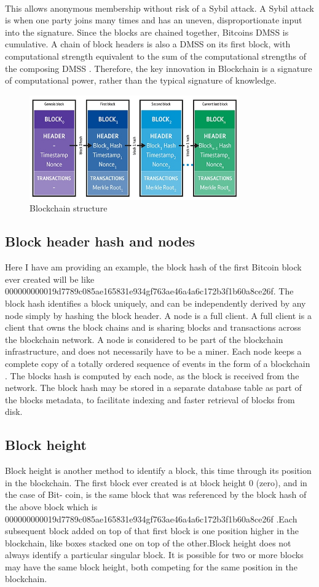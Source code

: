 \paragraph{}This allows anonymous membership without risk of a Sybil attack. A Sybil attack is when one
party joins many times and has an uneven, disproportionate input into the signature. Since the
blocks are chained together, Bitcoins DMSS is cumulative. A chain of block headers is also a
DMSS on its first block, with computational strength equivalent to the sum of the computational
strengths of the composing DMSS . Therefore, the key innovation in Blockchain is a signature of
computational power, rather than the typical signature of knowledge.
\begin{figure}[h]
	\centering
	\includegraphics[width=9cm]{./blockchain-diagrams-02}
	\caption{Blockchain structure}
\end{figure}
\subsection{Block header hash and nodes}
Here I have am providing an example, the block hash of the first Bitcoin block ever created will
be like 000000000019d7789c085ae165831e934gf763ae46a4a6c172b3f1b60a8ce26f. The block hash
identifies a block uniquely, and can be independently derived by any node simply by hashing the
block header. A node is a full client. A full client is a client that owns the block chains and is
sharing blocks and transactions across the blockchain network. A node is considered to be part
of the blockchain infrastructure, and does not necessarily have to be a miner. Each node keeps
a complete copy of a totally ordered sequence of events in the form of a blockchain . The blocks
hash is computed by each node, as the block is received from the network. The block hash may
be stored in a separate database table as part of the blocks metadata, to facilitate indexing and
faster retrieval of blocks from disk.
\subsection{Block height}
Block height is another method to identify a block, this time through its position in the
blockchain. The first block ever created is at block height 0 (zero), and in the case of Bit-
coin, is the same block that was referenced by the block hash of the above block which is
000000000019d7789c085ae165831e934gf763ae46a4a6c172b3f1b60a8ce26f .Each subsequent block
added on top of that first block is one position higher in the blockchain, like boxes stacked one on
top of the other.Block height does not always identify a particular singular block. It is possible
for two or more blocks may have the same block height, both competing for the same position
in the blockchain.
